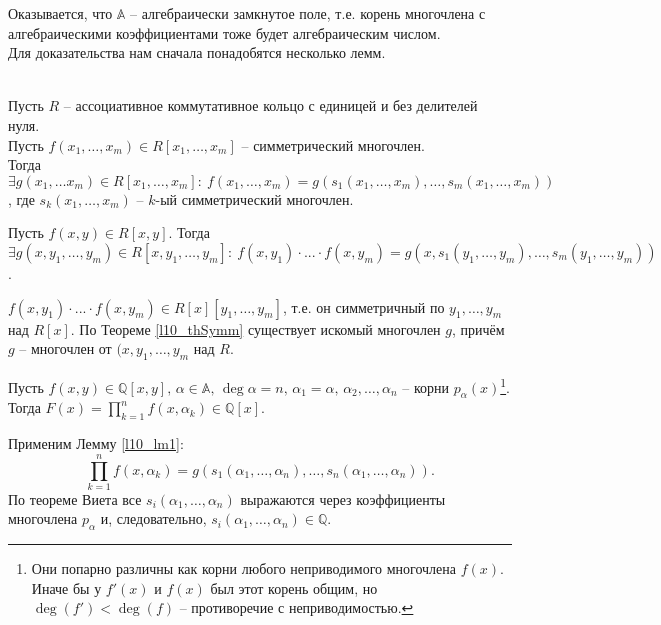 Оказывается, что $\mathbb{A}$ -- алгебраически замкнутое поле, т.е. корень многочлена с алгебраическими коэффициентами тоже будет алгебраическим числом.\\
Для доказательства нам сначала понадобятся несколько лемм.

\begin{theorem} \label{l10_thSymm}~\\
	Пусть $R$ -- ассоциативное коммутативное кольцо с единицей и без делителей нуля.\\
	Пусть $f \left( x_1, \dots, x_m \right) \in R \left[ x_1, \dots, x_m \right]$ -- симметрический многочлен.\\
	Тогда $\exists g\left( x_1, \dots x_m \right) \in R \left[ x_1, \dots, x_m \right]: \ f\left( x_1, \dots, x_m \right) = g\left( s_1\left( x_1, \dots, x_m \right), \dots, s_m\left( x_1, \dots, x_m \right) \right)$, где $s_k\left( x_1, \dots, x_m \right)$ -- $k$-ый симметрический многочлен.
\end{theorem}

\begin{lemma} \label{l10_lm1}
	Пусть $f(x,y) \in R[x,y]$. Тогда 
	$\displaystyle \exists g(x, y_1, \dots, y_m) \in R[x, y_1, \dots, y_m]: \ f(x,y_1)\cdot...\cdot f(x,y_m) = g(x,s_1(y_1,\dots,y_m),\dots,s_m(y_1,\dots,y_m))$.
\end{lemma}
\begin{pf}
	$f(x,y_1) \cdot ... \cdot f(x, y_m) \in R[x][y_1,\dots,y_m]$, т.е. он симметричный по $y_1,\dots,y_m$ над $R[x]$. По Теореме \ref{l10_thSymm} существует искомый многочлен $g$, причём $g$ -- многочлен от $(x,y_1,\dots,y_m$ над $R$.
\end{pf}

\begin{lemma} \label{l10_lm2}
	Пусть $f(x,y) \in \mathbb{Q}[x,y], \, \alpha \in \mathbb{A}, \, \deg\alpha = n, \, \alpha_1 = \alpha, \, \alpha_2,\dots,\alpha_n$ -- корни $p_\alpha(x)$\footnote{Они попарно различны как корни любого неприводимого многочлена $f(x)$. Иначе бы у $f'(x)$ и $f(x)$ был этот корень общим, но $\deg(f') < \deg(f)$ -- противоречие с неприводимостью.}. Тогда $F(x) = \prod\limits_{k=1}^n f(x,\alpha_k) \in \mathbb{Q}[x]$.
\end{lemma}
\begin{pf}
	Применим Лемму \ref{l10_lm1}:
	$$\prod\limits_{k=1}^n f(x, \alpha_k) = g\left( s_1\left( \alpha_1, \dots, \alpha_n \right), \dots, s_n\left( \alpha_1, \dots, \alpha_n \right) \right).$$
	По теореме Виета все $s_i(\alpha_1,\dots,\alpha_n)$ выражаются через коэффициенты многочлена $p_\alpha$ и, следовательно, $s_i(\alpha_1,\dots,\alpha_n) \in \mathbb{Q}$.
\end{pf}

